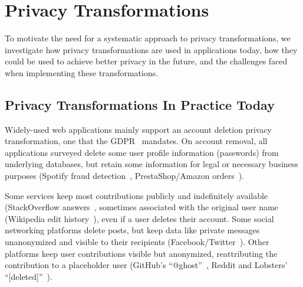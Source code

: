 \section{Privacy Transformations}
\label{sec:survey}

To motivate the need for a systematic approach to privacy transformations, we investigate how 
privacy transformations are used in applications today, how they could be used to achieve better
privacy in the future, and the challenges faced when implementing these transformations. 

\subsection{Privacy Transformations In Practice Today}
%
%
Widely-used web applications mainly support an account deletion privacy transformation,
one that \eg the GDPR~\cite[Art.\ 17]{eu:gdpr} mandates.
%
On account removal, all applications surveyed delete some user profile
information (\eg passwords) from underlying databases, but 
retain some information for legal or necessary business purposes
(\eg Spotify fraud detection~\cite{spotify:privacy}, PrestaShop/Amazon
orders~\cite{amazon:privacy, prestashop:privacy}).
%

Some services keep most contributions publicly and indefinitely available (\eg StackOverflow
answers~\cite{stackoverflow:privacy}, sometimes
associated with the original user name (\eg Wikipedia edit history~\cite{wikipedia:privacy}), even
if a user deletes their account.
%
Some social networking platforms delete posts, but keep data like private messages unanonymized and visible to their recipients (Facebook/Twitter~\cite{facebook:privacy, twitter:privacy}).
%
Other platforms keep user contributions visible but anonymized, reattributing the contribution to a placeholder user
(\eg GitHub's ``@ghost''~\cite{github:privacy}, Reddit and Lobsters'
``[deleted]''~\cite{reddit:privacy, lobsters:privacy}).
%
%

